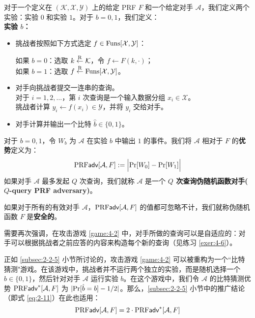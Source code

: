 \begin{game}[伪随机函数]\label{game:4-2}
对于一个定义在 $(\mathcal{K},\mathcal{X},\mathcal{Y})$ 上的给定 PRF $F$ 和一个给定对手 $\mathcal{A}$，我们定义两个实验：实验 $0$ 和实验 $1$。对于 $b=0,1$，我们定义：\\
\noindent\textbf{实验 $b$：}
\begin{itemize}
	\item 挑战者按照如下方式选定 $f\in{\rm Funs}[\mathcal{X},\mathcal{Y}]$：
	\vspace{1pt}
	
	\hspace*{5pt} 如果 $b=0$：选取 $k\overset{\rm R}\leftarrow\mathcal{K}$，令 $f\leftarrow F(k,\cdot)$；\\
	\hspace*{5pt} 如果 $b=1$：选取 $f\overset{\rm R}\leftarrow{\rm Funs}[\mathcal{X},\mathcal{Y}]$。
	\item 对手向挑战者提交一连串的查询。\\
	对于 $i=1,2,\dots$，第 $i$ 次查询是一个输入数据分组 $x_i\in\mathcal{X}$。\\
	挑战者计算 $y_i\leftarrow f(x_i)\in\mathcal{Y}$，并将 $y_i$ 交给对手。
	\item 对手计算并输出一个比特 $\hat{b}\in\{0,1\}$。
\end{itemize}
对于 $b=0,1$，令 $W_b$ 为 $\mathcal{A}$ 在实验 $b$ 中输出 $1$ 的事件。我们将 $\mathcal{A}$ 相对于 $F$ 的\textbf{优势}定义为：
\begin{equation}\label{eq:4-21}
\mathrm{PRF}\mathsf{adv}[\mathcal{A}, F]
:=
\Big\lvert
{\rm Pr}[W_0]-{\rm Pr}[W_1]
\Big\rvert
\end{equation}
如果对手 $\mathcal{A}$ 最多发起 $Q$ 次查询，我们就称 $\mathcal{A}$ 是一个 \textbf{$Q$ 次查询伪随机函数对手($Q$-query PRF adversary)}。
\end{game}

\begin{definition}\label{def:4-2}
如果对于所有的有效对手 $\mathcal{A}$，${\rm PRF\mathsf{adv}}[\mathcal{A},F]$ 的值都可忽略不计，我们就称伪随机函数 $F$ 是\textbf{安全的}。
\end{definition}

需要再次强调，在攻击游戏 \ref{game:4-2} 中，对手所做的查询可以是自适应的：对手可以根据挑战者之前应答的内容来构造每个新的查询（见练习 \ref{exer:4-6}）。

正如 \ref{subsec:2-2-5} 小节所讨论的，攻击游戏 \ref{game:4-2} 可以被重构为一个``比特猜测"游戏。在该游戏中，挑战者并不运行两个独立的实验，而是随机选择一个 $b\in\{0,1\}$，然后针对对手 $\mathcal{A}$ 运行实验 $b$。在这个游戏中，我们令 $\mathcal{A}$ 的比特猜测优势 ${\rm PRF\mathsf{adv}}^*[\mathcal{A}, F]$ 为 $|{\rm Pr}[\hat{b}=b]-{1}/{2}|$。那么，\ref{subsec:2-2-5} 小节中的推广结论（即式 \ref{eq:2-11}）在此也适用：
\begin{equation}
{\rm PRF\mathsf{adv}}[\mathcal{A}, F]=2\cdot {\rm PRF\mathsf{adv}}^*[\mathcal{A}, F]
\end{equation}


